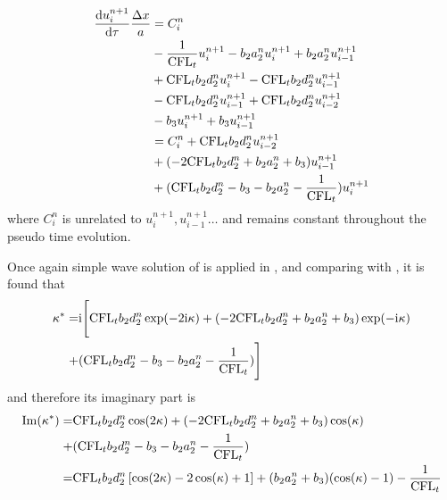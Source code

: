 \begin{equation}
    \begin{aligned}
        \frac{\dd u_i^{n+1}}{\dd \tau}\frac{{\Delta} x}{a} & =
        C_i^n                                              \\
                                                       &
        -  \frac{1}{\text{CFL}_t} u_i^{n+1}
        -  b_2a_2^n u_i^{n+1}
        +  b_2a_2^n u_{i-1}^{n+1}
        \\
                                                       &
        + \text{CFL}_t b_2 d_2^n u_i^{n+1}
        - \text{CFL}_t b_2 d_2^n u_{i-1}^{n+1}
        \\
                                                       &
        - \text{CFL}_t b_2 d_2^n u_{i-1}^{n+1}
        + \text{CFL}_t b_2 d_2^n u_{i-2}^{n+1}
        \\
                                                       &
        -b_3 u_i^{n+1}
        +b_3 u_{i-1}^{n+1}
        \\
                                                       &
        =C_i^n  +  \text{CFL}_t b_2 d_2^n u_{i-2}^{n+1}
        \\
                                                       & +
        (-2\text{CFL}_t b_2 d_2^n + b_2a_2^n + b_3)u_{i-1}^{n+1}
        \\
                                                       & +
        (\text{CFL}_t b_2 d_2^n - b_3 - b_2a_2^n -  \frac{1}{\text{CFL}_t})u_i^{n+1}
        \label{eq:nestedDITR_F2}
    \end{aligned}
\end{equation}
where $C_i^n$ is unrelated to $u_i^{n+1}, u_{i-1}^{n+1}\dots$
and remains constant throughout the pseudo time evolution.

Once again simple wave solution of 
is applied in , and comparing with
, it is found that
\begin{equation}
    \begin{aligned}
        \kappa^* = & \mathrm{i}
        \Biggl[
            \text{CFL}_t b_2 d_2^n \exp(-2\mathrm{i}\kappa)
            +
            (-2\text{CFL}_t b_2 d_2^n + b_2a_2^n + b_3)\exp(-\mathrm{i}\kappa)
        \\ + &
            (\text{CFL}_t b_2 d_2^n - b_3 - b_2a_2^n -  \frac{1}{\text{CFL}_t})
            \Biggr]
    \end{aligned}
\end{equation}
and therefore its imaginary part is
\begin{equation}
    \begin{aligned}
        \mathrm{Im}(\kappa^*) = &
        \text{CFL}_t b_2 d_2^n \cos(2\kappa)
        +
        (-2\text{CFL}_t b_2 d_2^n + b_2a_2^n + b_3)\cos(\kappa)
        \\ + &
        (\text{CFL}_t b_2 d_2^n - b_3 - b_2a_2^n -  \frac{1}{\text{CFL}_t})
        \\
        =                 &
        \text{CFL}_t b_2 d_2^n \left[\cos(2\kappa) -2\cos(\kappa) + 1\right]
        + (b_2a_2^n + b_3) (\cos(\kappa) - 1) - \frac{1}{\text{CFL}_t}
    \end{aligned}
    \label{eq:imagKsTauDITR}
\end{equation}

